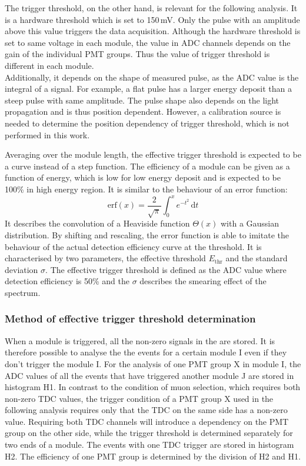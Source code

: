 The trigger threshold, on the other hand, is relevant for the following analysis. It is a hardware threshold which is set to 150\,mV. Only the pulse with an amplitude above this value triggers the data acquisition. Although the hardware threshold is set to same voltage in each module, the value in ADC channels depends on the gain of the individual PMT groups. Thus the value of trigger threshold is different in each module. \\
Additionally, it depends on the shape of measured pulse, as the ADC value is the integral of a signal. For example, a flat pulse has a larger energy deposit than a steep pulse with same amplitude. The pulse shape also depends on the light propagation and is thus position dependent. However, a calibration source is needed to determine the position dependency of trigger threshold, which is not performed in this work.

Averaging over the module length, the effective trigger threshold is expected to be a curve instead of a step function. The efficiency of a module can be given as a function of energy, which is low for low energy deposit and is expected to be 100\% in high energy region. It is similar to the behaviour of an error function:
\begin{equation}
  \mathrm{erf}(x)=\frac{2}{\sqrt{\pi}} \int_{0}^{x} \! e^{-t^{2}}\, \mathrm{d}t
\end{equation}
It describes the convolution of a Heaviside function $\Theta(x)$ with a Gaussian distribution. By shifting and rescaling, the error function is able to imitate the behaviour of the actual detection efficiency curve at the threshold. It is characterised by two parameters, the effective threshold $E_{\mathrm{thr}}$ and the standard deviation $\sigma$. The effective trigger threshold is defined as the ADC value where detection efficiency is 50\% and the $\sigma$ describes the smearing effect of the spectrum.

\subsubsection*{Method of effective trigger threshold determination}

When a module is triggered, all the non-zero signals in the \mvs{} are stored. It is therefore possible to analyse the the events for a certain module I even if they don't trigger the module I. For the analysis of one PMT group X in module I, the ADC values of all the events that have triggered another module J are stored in histogram H1. In contrast to the condition of muon selection, which requires both non-zero TDC values, the trigger condition of a PMT group X used in the following analysis requires only that the TDC on the same side has a non-zero value. Requiring both TDC channels will introduce a dependency on the PMT group on the other side, while the trigger threshold is determined separately for two ends of a module. The events with one TDC trigger are stored in histogram H2. The efficiency of one PMT group is determined by the division of H2 and H1.

